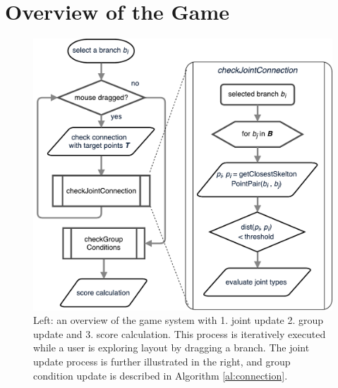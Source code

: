 \documentclass[review]{acmsiggraph}
\begin{document}
%

\section{Overview of the Game}


\label{sec:game_flow}
 \begin{figure}[h]
 	\begin{center}
 		\includegraphics[width = 0.35\paperwidth]{images/system/closestPointAlgorithm.pdf}
 		\caption{Left: an overview of the game system with 1. joint update 2. group update and 3. score calculation. This process is iteratively executed while a user is exploring layout by dragging a branch. The joint update process is further illustrated in the right, and group condition update is described in Algorithm \ref{al:connection}. }
 		\label{fig:system_flowchart}
 	\end{center}
 \end{figure}
\end{document}
